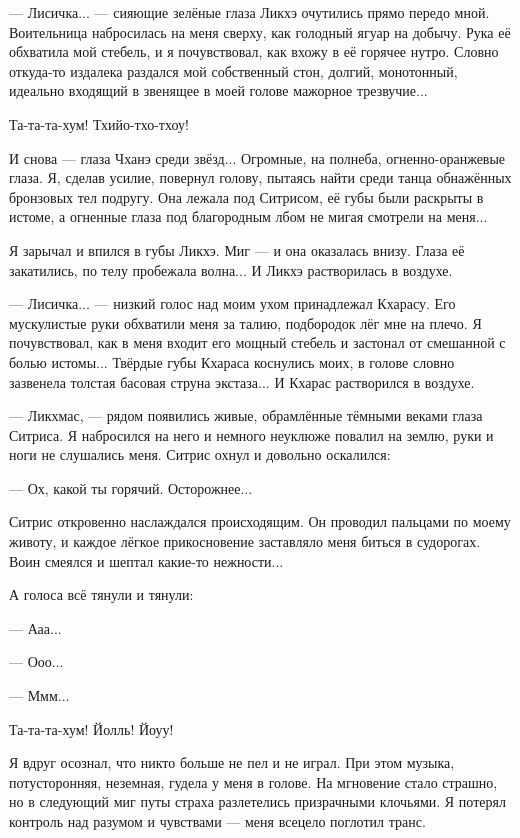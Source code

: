 --- Лисичка... --- сияющие зелёные глаза Ликхэ очутились прямо передо мной.
Воительница набросилась на меня сверху, как голодный ягуар на добычу.
Рука её обхватила мой стебель, и я почувствовал, как вхожу в её горячее нутро.
Словно откуда-то издалека раздался мой собственный стон, долгий, монотонный, идеально входящий в звенящее в моей голове мажорное трезвучие...

Та-та-та-хум!
Тхийо-тхо-тхоу!

И снова --- глаза Чханэ среди звёзд...
Огромные, на полнеба, огненно-оранжевые глаза.
Я, сделав усилие, повернул голову, пытаясь найти среди танца обнажённых бронзовых тел подругу.
Она лежала под Ситрисом, её губы были раскрыты в истоме, а огненные глаза под благородным лбом не мигая смотрели на меня...

Я зарычал и впился в губы Ликхэ.
Миг --- и она оказалась внизу.
Глаза её закатились, по телу пробежала волна...
И Ликхэ растворилась в воздухе.

--- Лисичка... --- низкий голос над моим ухом принадлежал Кхарасу.
Его мускулистые руки обхватили меня за талию, подбородок лёг мне на плечо.
Я почувствовал, как в меня входит его мощный стебель и застонал от смешанной с болью истомы...
Твёрдые губы Кхараса коснулись моих, в голове словно зазвенела толстая басовая струна экстаза...
И Кхарас растворился в воздухе.

--- Ликхмас, --- рядом появились живые, обрамлённые тёмными веками глаза Ситриса.
Я набросился на него и немного неуклюже повалил на землю, руки и ноги не слушались меня.
Ситрис охнул и довольно оскалился:

--- Ох, какой ты горячий.
Осторожнее...

Ситрис откровенно наслаждался происходящим.
Он проводил пальцами по моему животу, и каждое лёгкое прикосновение заставляло меня биться в судорогах.
Воин смеялся и шептал какие-то нежности...

А голоса всё тянули и тянули:

--- Ааа...

--- Ооо...

--- Ммм...

Та-та-та-хум!
Йолль!
Йоуу!

Я вдруг осознал, что никто больше не пел и не играл.
При этом музыка, потусторонняя, неземная, гудела у меня в голове.
На мгновение стало страшно, но в следующий миг путы страха разлетелись призрачными клочьями.
Я потерял контроль над разумом и чувствами --- меня всецело поглотил транс.

